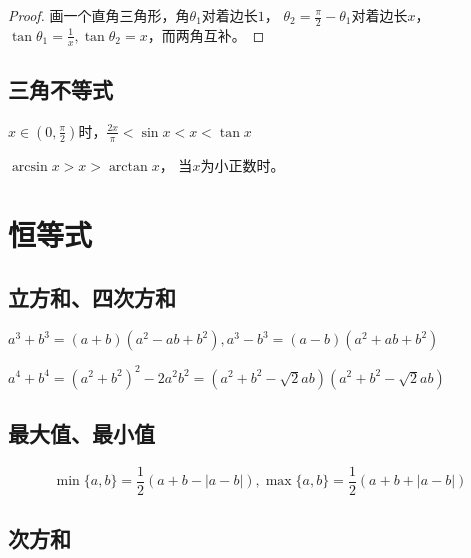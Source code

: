 \begin{proof}
  画一个直角三角形，角$\theta_1$对着边长$1$，
  $\theta_2 = \frac{\pi}{2} - \theta_1$对着边长$x$，
  $\tan \theta_1 = \frac{1}{x}, \tan \theta_2 = x$，而两角互补。
\end{proof}

\subsection{三角不等式}

\begin{theorem}
  $x \in (0, \frac{\pi}{2})$时，$\frac{2x}{\pi} < \sin x < x < \tan x$
\end{theorem}

\begin{theorem}[反三角不等式]
  $\arcsin x > x > \arctan x$，
  当$x$为小正数时。
\end{theorem}

\section{恒等式}

\subsection{立方和、四次方和}

\begin{theorem}[立方和公式]
  $a^3 + b^3 = (a+b)(a^2 - ab + b^2), a^3 - b^3 = (a-b)(a^2 + ab + b^2)$
\end{theorem}

\begin{theorem}[四次方和差公式]
  $a^4 + b^4 = (a^2 + b^2)^2 - 2a^2b^2 = (a^2 + b^2 - \sqrt{2}ab)(a^2 + b^2 - \sqrt{2}ab)$
\end{theorem}

\subsection{最大值、最小值}

\begin{equation*}
  \min\{a,b\} = \frac{1}{2}(a+b - |a-b|), \max \{a,b\} = \frac{1}{2}(a + b + |a-b|)
\end{equation*}

\subsection{次方和}


